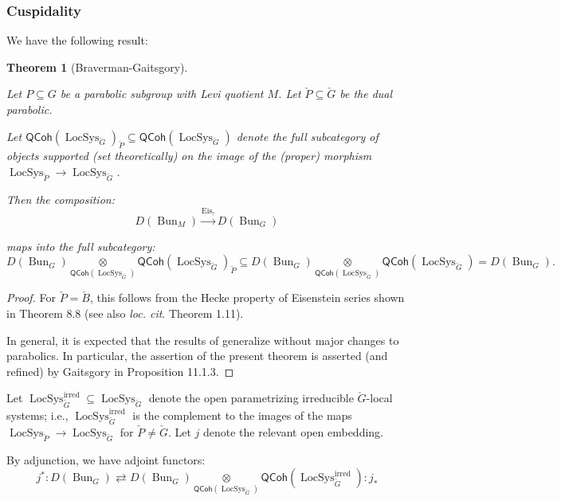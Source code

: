 \documentclass[reqno,11pt]{amsart}
\numberwithin{equation}{subsection}
\newtheorem{thm}{Theorem}[subsubsection]
\theoremstyle{remark}
\newcommand{\xar}[1]{\xrightarrow{#1}}
\newcommand{\on}{\operatorname}
\newcommand{\Bun}{\on{Bun}}
\newcommand{\LocSys}{\on{LocSys}}
\newcommand{\QCoh}{\mathsf{QCoh}}
\renewcommand{\subset}{\subseteq}
\begin{document}
\subsubsection{Cuspidality}

We have the following result:

\begin{thm}[Braverman-Gaitsgory]\label{t:bg-eis}

Let $P \subset G$ be a parabolic subgroup with Levi quotient $M$.
Let $\check{P} \subset \check{G}$ be the dual parabolic.

Let $\QCoh(\LocSys_{\check{G}})_{\check{P}} \subset 
\QCoh(\LocSys_{\check{G}})$ 
denote the full subcategory of objects supported (set theoretically) 
on the image of the (proper) morphism 
$\LocSys_{\check{P}} \to \LocSys_{\check{G}}$.

Then the composition:
%
\[
D(\Bun_M) \xar{\on{Eis}_!} D(\Bun_G)
\]

\noindent maps into the full subcategory:
%
\[
D(\Bun_G) 
\underset{\QCoh(\LocSys_{\check{G}})}{\otimes} 
\QCoh(\LocSys_{\check{G}})_{\check{P}} \subset
D(\Bun_G) 
\underset{\QCoh(\LocSys_{\check{G}})}{\otimes} 
\QCoh(\LocSys_{\check{G}}) = D(\Bun_G).
\]

\end{thm}

\begin{proof}

For $\check{P} = \check{B}$, this follows from the
Hecke property of Eisenstein series shown in 
\cite{bg-deformations} Theorem 8.8 (see also \emph{loc. cit}.
Theorem 1.11). 

In general, it is expected that the results of 
\cite{bg-deformations} generalize without major changes
to parabolics. In particular, the assertion of the present
theorem is asserted (and refined) by Gaitsgory in
\cite{dennis-laumonconf} Proposition 11.1.3.
 
\end{proof}

Let $\LocSys_{\check{G}}^{\on{irred}} \subset \LocSys_{\check{G}}$
denote the open parametrizing irreducible $\check{G}$-local systems;
i.e., $\LocSys_{\check{G}}^{\on{irred}}$ is the complement to the
images of the maps $\LocSys_{\check{P}} \to \LocSys_{\check{G}}$ for
$\check{P} \neq \check{G}$. Let $j$ denote the relevant open embedding.

By adjunction, we have adjoint functors:
%
\[
j^*:D(\Bun_G) \rightleftarrows 
D(\Bun_G) 
\underset{\QCoh(\LocSys_{\check{G}})}{\otimes}
\QCoh(\LocSys_{\check{G}}^{\on{irred}})
:j_*
\]
\end{document}
